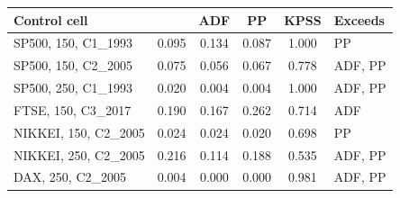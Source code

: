 \begin{tabular}{lccccl}
\toprule
Control cell & \RMGLS{} & ADF & PP & KPSS & Exceeds \\
\midrule
SP500, 150, C1\_1993 & 0.095 & 0.134 & 0.087 & 1.000 & PP \\
SP500, 150, C2\_2005 & 0.075 & 0.056 & 0.067 & 0.778 & ADF, PP \\
SP500, 250, C1\_1993 & 0.020 & 0.004 & 0.004 & 1.000 & ADF, PP \\
FTSE, 150, C3\_2017 & 0.190 & 0.167 & 0.262 & 0.714 & ADF \\
NIKKEI, 150, C2\_2005 & 0.024 & 0.024 & 0.020 & 0.698 & PP \\
NIKKEI, 250, C2\_2005 & 0.216 & 0.114 & 0.188 & 0.535 & ADF, PP \\
DAX, 250, C2\_2005 & 0.004 & 0.000 & 0.000 & 0.981 & ADF, PP \\
\bottomrule
\end{tabular}
